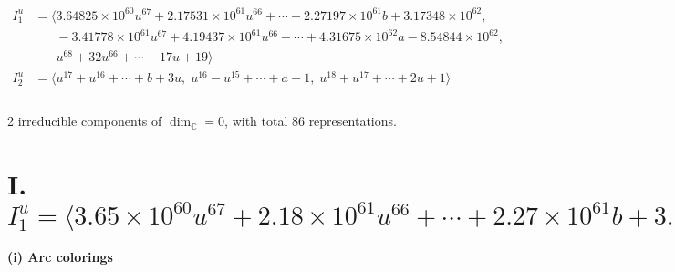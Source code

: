 \documentclass[1p]{elsarticle_modified}
\theoremstyle{definition}
\begin{document}
\begin{align*}
I^u_{1}&=\langle 
3.64825\times10^{60} u^{67}+2.17531\times10^{61} u^{66}+\cdots+2.27197\times10^{61} b+3.17348\times10^{62},\\
\phantom{I^u_{1}}&\phantom{= \langle  }-3.41778\times10^{61} u^{67}+4.19437\times10^{61} u^{66}+\cdots+4.31675\times10^{62} a-8.54844\times10^{62},\\
\phantom{I^u_{1}}&\phantom{= \langle  }u^{68}+32 u^{66}+\cdots-17 u+19\rangle \\
I^u_{2}&=\langle 
u^{17}+u^{16}+\cdots+b+3 u,\;u^{16}- u^{15}+\cdots+a-1,\;u^{18}+u^{17}+\cdots+2 u+1\rangle \\
\\
\end{align*}
\raggedright * 2 irreducible components of $\dim_{\mathbb{C}}=0$, with total 86 representations.\\
\newpage
\renewcommand{\arraystretch}{1}
\centering \section*{I. $I^u_{1}= \langle 3.65\times10^{60} u^{67}+2.18\times10^{61} u^{66}+\cdots+2.27\times10^{61} b+3.17\times10^{62},\;-3.42\times10^{61} u^{67}+4.19\times10^{61} u^{66}+\cdots+4.32\times10^{62} a-8.55\times10^{62},\;u^{68}+32 u^{66}+\cdots-17 u+19 \rangle$}
\flushleft \textbf{(i) Arc colorings}\\
\end{document}
